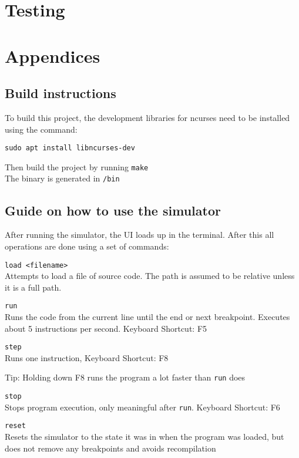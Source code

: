 \documentclass[12pt]{article}
\begin{document}
	\section{Testing}

	\newpage
	\appendix
	\section{Appendices}
	
	\subsection{Build instructions}

	To build this project, the development libraries for ncurses need to be installed using the command:

	\verb|sudo apt install libncurses-dev|	

	Then build the project by running \verb|make|\\
	The binary is generated in \verb|/bin|

	\subsection{Guide on how to use the simulator}

	After running the simulator, the UI loads up in the terminal. After this all operations are done using a set of commands:

	\verb|load <filename>|\\
	Attempts to load a file of source code. The path is assumed to be relative unless it is a full path.
	
	\verb|run|\\
	Runs the code from the current line until the end or next breakpoint. Executes about 5 instructions per second. Keyboard Shortcut: F5

	\verb|step|\\
	Runs one instruction, Keyboard Shortcut: F8

	Tip: Holding down F8 runs the program a lot faster than \verb|run| does

	\verb|stop|\\
	Stops program execution, only meaningful after \verb|run|. Keyboard Shortcut: F6

	\verb|reset|\\
	Resets the simulator to the state it was in when the program was loaded, but does not remove any breakpoints and avoids recompilation
\end{document}
